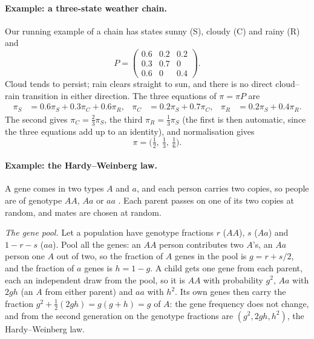\paragraph{Example: a three-state weather chain.}
Our running example of a chain has states sunny (S), cloudy (C) and rainy (R) and
\begin{equation}
  P=\begin{pmatrix}0.6&0.2&0.2\\0.3&0.7&0\\0.6&0&0.4\end{pmatrix}.
  \label{9a:eq:weather3}
\end{equation}
Cloud tends to persist; rain clears straight to sun, and there is no direct cloud--rain
transition in either direction. The three equations of $\pi=\pi P$ are
\begin{align*}
  \pi_S&=0.6\pi_S+0.3\pi_C+0.6\pi_R,&
  \pi_C&=0.2\pi_S+0.7\pi_C,&
  \pi_R&=0.2\pi_S+0.4\pi_R .
\end{align*}
The second gives $\pi_C=\tfrac23\pi_S$, the third $\pi_R=\tfrac13\pi_S$ (the first is then
automatic, since the three equations add up to an identity), and normalisation gives
\begin{equation}
  \pi=\bigl(\tfrac12,\ \tfrac13,\ \tfrac16\bigr).
  \label{9a:eq:pi-weather3}
\end{equation}

\paragraph{Example: the Hardy--Weinberg law.}
A gene comes in two types $A$ and $a$, and each person carries two copies, so people are of
genotype $AA$, $Aa$ or $aa$ . Each parent passes on one of its two
copies at random, and mates are chosen at random.

\emph{The gene pool.} Let a population have genotype fractions $r$ ($AA$), $s$ ($Aa$) and
$1-r-s$ ($aa$). Pool all the genes: an $AA$ person contributes two $A$'s, an $Aa$ person one
$A$ out of two, so the fraction of $A$ genes in the pool is $g=r+s/2$, and the fraction of $a$
genes is $h=1-g$. A child gets one gene from each parent, each an independent draw from the
pool, so it is $AA$ with probability $g^2$, $Aa$ with $2gh$ (an $A$ from either parent) and
$aa$ with $h^2$. Its own genes then carry the fraction $g^2+\tfrac12(2gh)=g(g+h)=g$ of $A$: the
gene frequency does not change, and from the second generation on the genotype fractions are
$(g^2,2gh,h^2)$, the Hardy--Weinberg law.


